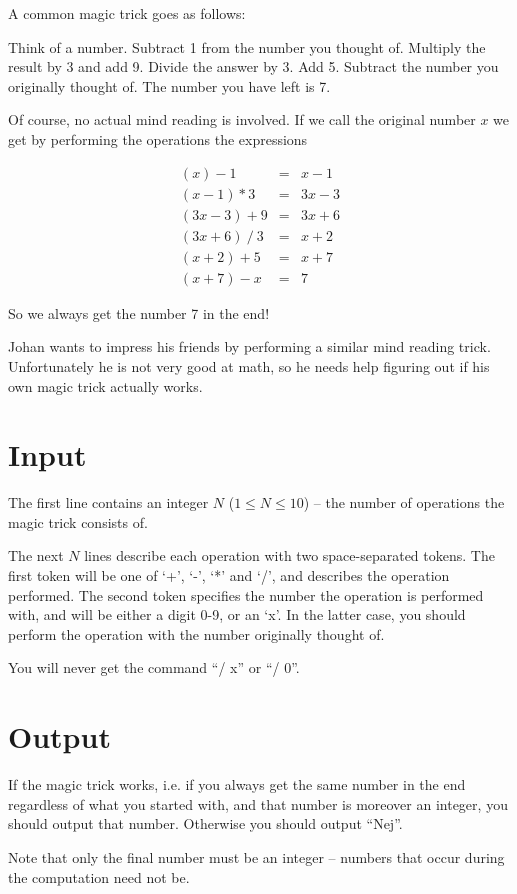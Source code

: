 
A common magic trick goes as follows:

Think of a number. Subtract 1 from the number you thought of. Multiply the result by 3 and add 9. Divide the answer by 3. Add 5. Subtract the number you originally thought of. The number you have left is 7.

Of course, no actual mind reading is involved. If we call the original number $x$ we get by performing the operations the expressions

\[\begin{array}{rcl}
(x) - 1 & = & x - 1 \\
(x - 1) * 3 & = & 3x - 3 \\
(3x - 3) + 9 & = & 3x + 6 \\
(3x + 6)\ /\ 3 & = & x + 2 \\
(x + 2) + 5 & = & x + 7 \\
(x + 7) - x & = & 7
\end{array}\]

So we always get the number 7 in the end!

Johan wants to impress his friends by performing a similar mind reading trick. Unfortunately he is not very good at math, so he needs help figuring out if his own magic trick actually works.

\section*{Input}

The first line contains an integer $N$ ($1 \le N \le 10$) -- the number of operations the magic trick consists of.

The next $N$ lines describe each operation with two space-separated tokens. The first token will be one of `+', `-', `*' and `/', and describes the operation performed. The second token specifies the number the operation is performed with, and will be either a digit 0-9, or an `x'. In the latter case, you should perform the operation with the number originally thought of.

You will never get the command ``/ x'' or ``/ 0''.

\section*{Output}

If the magic trick works, i.e. if you always get the same number in the end regardless of what you started with, and that number is moreover an integer, you should output that number. Otherwise you should output ``Nej''.

Note that only the final number must be an integer -- numbers that occur during the computation need not be.
